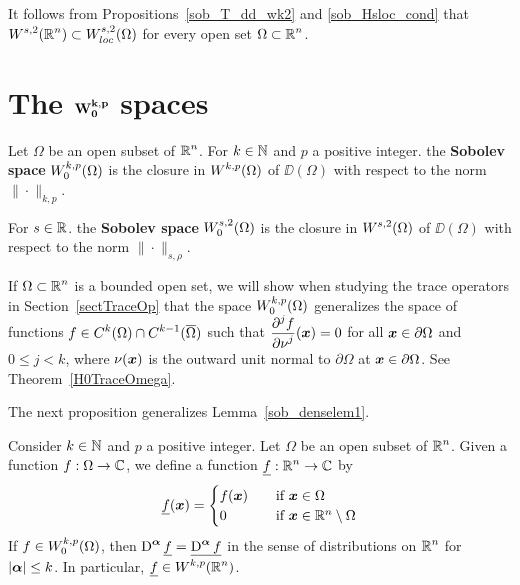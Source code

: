 It follows from Propositions~\ref{sob_T_dd_wk2} and
\ref{sob_Hsloc_cond} that
$\displaystyle W^{s,2}(\mathbb{R}^n) \subset W^{s,2}_{loc}(\Omega)$
for every open set $\displaystyle \Omega \subset \mathbb{R}^n$.

\section{The $\displaystyle \mathbf{W^{k,p}_0}$ spaces}

\begin{defn}
Let $\Omega$ be an open subset of $\displaystyle \mathbb{R}^n$.
For $k\in \mathbb{N}$ and $p$ a positive integer. the
{\bfseries Sobolev space}
$\displaystyle W^{k,p}_0(\Omega)$ is the closure in 
$\displaystyle W^{k,p}(\Omega)$ of $\DD(\Omega)$ with respect to the norm
$\|\cdot\|_{k,p}$.

For $s \in \mathbb{R}$. the
{\bfseries Sobolev space}
$\displaystyle W^{s,2}_0(\Omega)$ is the closure in 
$\displaystyle W^{s,2}(\Omega)$ of $\DD(\Omega)$ with respect to the norm
$\|\cdot\|_{s,\rho}$.
\end{defn}

If $\displaystyle \Omega \subset \mathbb{R}^n$ is a bounded open set, we will
show when studying the trace operators in Section~\ref{sectTraceOp}
that the space $\displaystyle W^{k,p}_0(\Omega)$ generalizes the space
of functions $\displaystyle f \in C^k(\Omega) \cap C^{k-1}(\overline{\Omega})$
such that $\displaystyle \frac{\displaystyle \partial^{j}{f}} {\displaystyle \partial \nu^{j}}({\bm{x}}) = 0$ for all
${\bm{x}} \in \partial \Omega$ and $0 \leq j <k$, where
$\nu({\bm{x}})$ is the outward unit normal to $\partial \Omega$
at ${\bm{x}} \in \partial \Omega$.  See Theorem~\ref{H0TraceOmega}.

The next proposition generalizes Lemma~\ref{sob_denselem1}.

\begin{prop} \label{sob_expand_WKP}
Consider $k\in \mathbb{N}$ and $p$ a positive integer.  Let $\Omega$ be an
open subset of $\displaystyle \mathbb{R}^n$.  Given a function
$f:\Omega \rightarrow \mathbb{C}$,
we define a function $\displaystyle \underline{f}:\mathbb{R}^n\rightarrow \mathbb{C}$ by
\[
\underline{f}({\bm{x}}) =
\begin{cases}
f({\bm{x}}) & \quad \text{if} \ {\bm{x}} \in \Omega \\
0 & \quad \text{if} \ {\bm{x}} \in \mathbb{R}^n \setminus \Omega
\end{cases}
\]
If $\displaystyle f \in W^{k,p}_0(\Omega)$, then
$\displaystyle \operatorname{D}^{{\bm{\alpha}}} \underline{f}
= \underline{\operatorname{D}^{{\bm{\alpha}}} f}$
in the sense of distributions on $\displaystyle \mathbb{R}^n$ for
$|{\bm{\alpha}}|\leq k$.  In particular,
$\displaystyle \underline{f} \in W^{k,p}(\mathbb{R}^n)$.
\end{prop}

